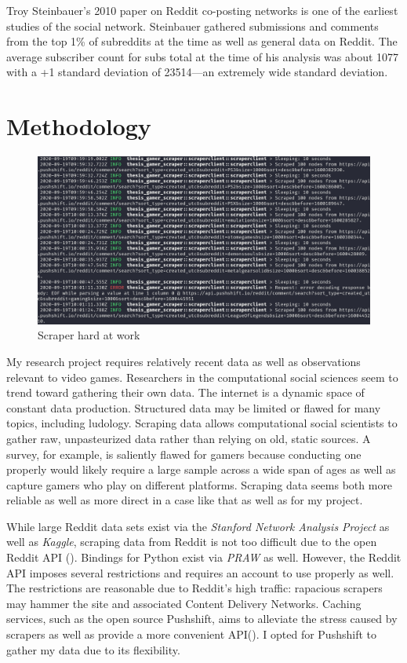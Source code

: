 \documentclass[12pt, a4paper]{article}
\begin{document}
Troy Steinbauer's 2010 paper on Reddit co-posting networks is one of the earliest studies of the social network. Steinbauer gathered submissions and comments from the top 1\% of subreddits at the time as well as general data on Reddit. The average subscriber count for subs total at the time of his analysis was about 1077 with a +1 standard deviation of 23514---an extremely wide standard deviation.

\section{Methodology}

\begin{figure}[h!]
  \includegraphics[width=\linewidth]{scraper_at_work.png}
  \caption{Scraper hard at work}
  \label{fig:workingscraper}
\end{figure}

My research project requires relatively recent data as well as observations relevant to video games. Researchers in the computational social sciences seem to trend toward gathering their own data. The internet is a dynamic space of constant data production. Structured data may be limited or flawed for many topics, including ludology. Scraping data allows computational social scientists to gather raw, unpasteurized data rather than relying on old, static sources. A survey, for example, is saliently flawed for gamers because conducting one properly would likely require a large sample across a wide span of ages as well as capture gamers who play on different platforms. Scraping data seems both more reliable as well as more direct in a case like that as well as for my project.

While large Reddit data sets exist via the \textit{Stanford Network Analysis Project} as well as \textit{Kaggle}, scraping data from Reddit is not too difficult due to the open Reddit API (\cite{redditapi}). Bindings for Python exist via \textit{PRAW} as well. However, the Reddit API imposes several restrictions and requires an account to use properly as well. The restrictions are reasonable due to Reddit's high traffic: rapacious scrapers may hammer the site and associated Content Delivery Networks. Caching services, such as the open source Pushshift, aims to alleviate the stress caused by scrapers as well as provide a more convenient API(\cite{pushshiftapi}). I opted for Pushshift to gather my data due to its flexibility.
\end{document}
